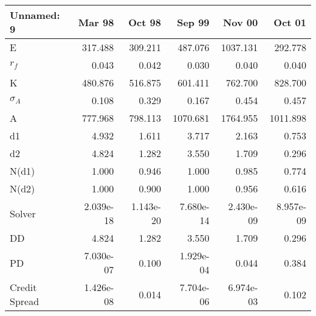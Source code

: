 \begin{tabular}{lrrrrr}
\toprule
    Unnamed: 9 &    Mar 98 &    Oct 98 &    Sep 99 &    Nov 00 &    Oct 01 \\
\midrule
             E &   317.488 &   309.211 &   487.076 &  1037.131 &   292.778 \\
         $r_f$ &     0.043 &     0.042 &     0.030 &     0.040 &     0.040 \\
             K &   480.876 &   516.875 &   601.411 &   762.700 &   828.700 \\
    $\sigma_A$ &     0.108 &     0.329 &     0.167 &     0.454 &     0.457 \\
             A &   777.968 &   798.113 &  1070.681 &  1764.955 &  1011.898 \\
            d1 &     4.932 &     1.611 &     3.717 &     2.163 &     0.753 \\
            d2 &     4.824 &     1.282 &     3.550 &     1.709 &     0.296 \\
         N(d1) &     1.000 &     0.946 &     1.000 &     0.985 &     0.774 \\
         N(d2) &     1.000 &     0.900 &     1.000 &     0.956 &     0.616 \\
        Solver & 2.039e-18 & 1.143e-20 & 7.680e-14 & 2.430e-09 & 8.957e-09 \\
            DD &     4.824 &     1.282 &     3.550 &     1.709 &     0.296 \\
            PD & 7.030e-07 &     0.100 & 1.929e-04 &     0.044 &     0.384 \\
 Credit Spread & 1.426e-08 &     0.014 & 7.704e-06 & 6.974e-03 &     0.102 \\
\bottomrule
\end{tabular}
